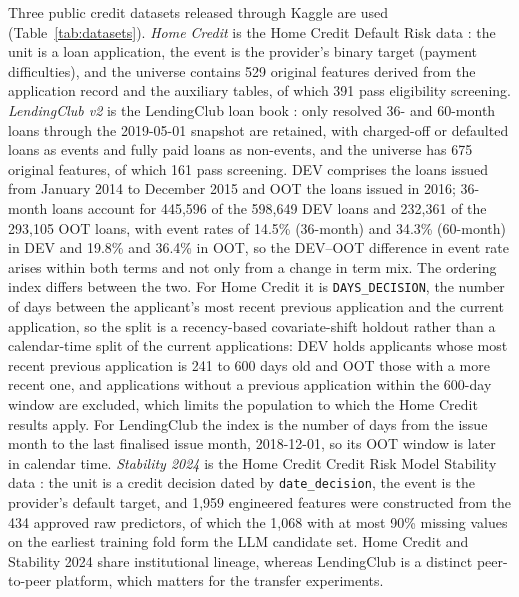 \documentclass[final,5p,twocolumn]{elsarticle}
\begin{document}
Three public credit datasets released through Kaggle are used (Table~\ref{tab:datasets}). \emph{Home Credit} is the Home Credit Default Risk data \cite{homecredit2018}: the unit is a loan application, the event is the provider's binary target (payment difficulties), and the universe contains 529 original features derived from the application record and the auxiliary tables, of which 391 pass eligibility screening. \emph{LendingClub v2} is the LendingClub loan book \cite{lendingclub_kaggle}: only resolved 36- and 60-month loans through the 2019-05-01 snapshot are retained, with charged-off or defaulted loans as events and fully paid loans as non-events, and the universe has 675 original features, of which 161 pass screening. DEV comprises the loans issued from January 2014 to December 2015 and OOT the loans issued in 2016; 36-month loans account for 445,596 of the 598,649 DEV loans and 232,361 of the 293,105 OOT loans, with event rates of 14.5\% (36-month) and 34.3\% (60-month) in DEV and 19.8\% and 36.4\% in OOT, so the DEV--OOT difference in event rate arises within both terms and not only from a change in term mix. The ordering index differs between the two. For Home Credit it is \texttt{DAYS\_DECISION}, the number of days between the applicant's most recent previous application and the current application, so the split is a recency-based covariate-shift holdout rather than a calendar-time split of the current applications: DEV holds applicants whose most recent previous application is 241 to 600 days old and OOT those with a more recent one, and applications without a previous application within the 600-day window are excluded, which limits the population to which the Home Credit results apply. For LendingClub the index is the number of days from the issue month to the last finalised issue month, 2018-12-01, so its OOT window is later in calendar time. \emph{Stability 2024} is the Home Credit Credit Risk Model Stability data \cite{homecredit2024}: the unit is a credit decision dated by \texttt{date\_decision}, the event is the provider's default target, and 1,959 engineered features were constructed from the 434 approved raw predictors, of which the 1,068 with at most 90\% missing values on the earliest training fold form the LLM candidate set. Home Credit and Stability 2024 share institutional lineage, whereas LendingClub is a distinct peer-to-peer platform, which matters for the transfer experiments.
\end{document}
